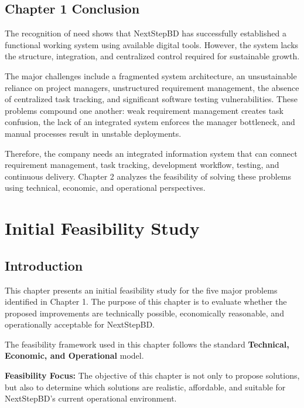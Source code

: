 \documentclass[12pt,a4paper]{report}
\begin{document}
\section{Chapter 1 Conclusion}

The recognition of need shows that NextStepBD has successfully established a functional working system using available digital tools. However, the system lacks the structure, integration, and centralized control required for sustainable growth.

The major challenges include a fragmented system architecture, an unsustainable reliance on project managers, unstructured requirement management, the absence of centralized task tracking, and significant software testing vulnerabilities. These problems compound one another: weak requirement management creates task confusion, the lack of an integrated system enforces the manager bottleneck, and manual processes result in unstable deployments.

Therefore, the company needs an integrated information system that can connect requirement management, task tracking, development workflow, testing, and continuous delivery. Chapter 2 analyzes the feasibility of solving these problems using technical, economic, and operational perspectives.

\newpage

\chapter{Initial Feasibility Study}

\section{Introduction}

This chapter presents an initial feasibility study for the five major problems identified in Chapter 1. The purpose of this chapter is to evaluate whether the proposed improvements are technically possible, economically reasonable, and operationally acceptable for NextStepBD.

The feasibility framework used in this chapter follows the standard \textbf{Technical, Economic, and Operational} model.

\begin{noteBox}
\textbf{Feasibility Focus:} The objective of this chapter is not only to propose solutions, but also to determine which solutions are realistic, affordable, and suitable for NextStepBD's current operational environment.
\end{noteBox}
\end{document}
